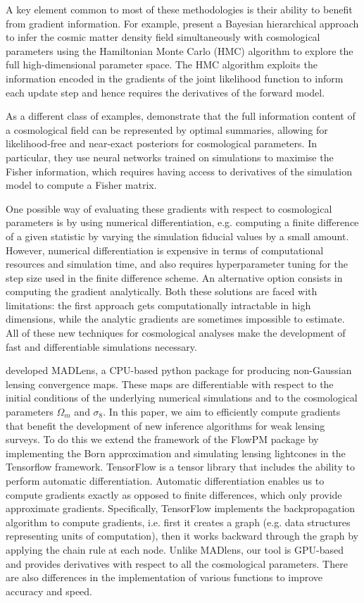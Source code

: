 \documentclass{aa}
\begin{document}
A key element common to most of these methodologies is their ability to benefit from gradient information. 
For example, \cite{porqueres2021bayesian} present a Bayesian hierarchical approach to infer the cosmic matter density field simultaneously with cosmological parameters using the Hamiltonian Monte Carlo (HMC) algorithm to explore the full high-dimensional parameter space. The HMC algorithm exploits the information encoded in the gradients of the joint likelihood function to inform each update step and hence requires the derivatives of the forward model. 

 As a different class of examples, \cite{makinen2021lossless} demonstrate that the full information content of a cosmological field can be represented by optimal summaries, allowing for likelihood-free and near-exact posteriors for cosmological parameters. In particular, they use neural networks trained on simulations to maximise the Fisher information, which requires having access to derivatives of the simulation model to compute a Fisher matrix.  

One possible way of evaluating these gradients with respect to cosmological parameters is by using numerical differentiation, e.g. computing a finite difference of a given statistic by varying the simulation fiducial values by a small amount.
However, numerical differentiation is expensive in terms of computational resources and simulation time, and also requires hyperparameter tuning for the step size used in the finite difference scheme. An alternative option consists in computing the gradient analytically. Both these solutions are faced with limitations: the first approach gets computationally intractable in high dimensions, while the analytic gradients are sometimes impossible to estimate.
All of these new techniques for cosmological analyses make the development of fast and differentiable simulations necessary.

\cite{bohm2021madlens} developed MADLens, a CPU-based python package for producing non-Gaussian lensing convergence maps. These maps are differentiable with respect to the initial conditions of the underlying numerical simulations and to the cosmological parameters $\Omega_m$ and $\sigma_8$. In this paper,  we aim to efficiently compute gradients that benefit the development of new inference algorithms for weak lensing surveys. To do this we extend the framework of the FlowPM package \cite{modi2021flowpm} by implementing the Born approximation and simulating lensing lightcones in the Tensorflow framework. TensorFlow is a tensor library that includes the ability to perform automatic differentiation. Automatic differentiation enables us to compute gradients exactly as opposed to finite differences, which only provide approximate gradients. Specifically, TensorFlow implements the backpropagation algorithm to compute gradients, i.e. first it creates a graph (e.g. data structures representing units of computation), then it works backward through the graph by applying the chain rule at each node. Unlike MADlens, our tool is GPU-based and provides derivatives with respect to all the cosmological parameters. There are also differences in the implementation of various functions to improve accuracy and speed.
\end{document}
